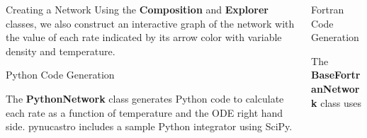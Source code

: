 \documentclass[final]{beamer}
\newlength{\onecolwid}
\newlength{\twocolwid}
\newcommand{\isotm}[2]{{}^{#2}\mathrm{#1}}
\begin{document}
\begin{frame}[t]
\begin{columns}[t]
\begin{column}{\twocolwid}
\begin{columns}[t,totalwidth=\twocolwid]
\begin{column}{\onecolwid}
\begin{block}{Creating a Network}
Using the \textbf{Composition} and \textbf{Explorer} classes, we also
construct an interactive graph of the network with the value of each
rate indicated by its arrow color with variable density and temperature.

\end{block}

\begin{block}{Python Code Generation}

The \textbf{PythonNetwork} class generates Python code to calculate
each rate as a function of temperature and the ODE right hand
side. pynucastro includes a sample Python integrator using SciPy.


\end{block}


\end{column} %

\begin{column}{\onecolwid}\vspace{-.6in} %




\begin{block}{Fortran Code Generation}

The \textbf{BaseFortranNetwork} class uses 


\end{block}
\end{column}
\end{columns}
\end{column}
\end{columns}
\end{frame}
\end{document}

